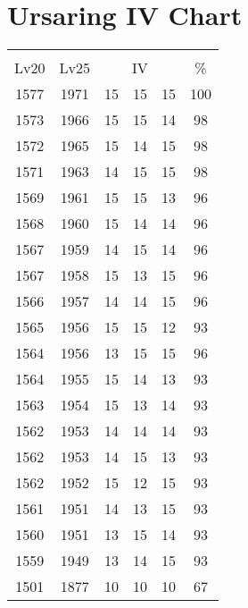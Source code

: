 \documentclass{article}%
\begin{document}
%
\normalsize%
\section{Ursaring IV Chart}%
\label{sec:Ursaring IV Chart}%
\renewcommand{\arraystretch}{1.5}%
\begin{tabular}{|c|c|c|c|c|c|}%
\hline%
\multicolumn{6}{|c|}{\textcolor{white}{ 
\linebreak{Ursaring}
}%
\cellcolor{black}}\\%
\multicolumn{1}{|c}{Lv20}&\multicolumn{1}{c|}{Lv25}&\multicolumn{3}{c|}{IV}&\multicolumn{1}{|c|}{\%}\\%
\hline%
\rowcolor{color100}%
1577&1971&15&15&15&100\\%
\hline%
\rowcolor{color98}%
1573&1966&15&15&14&98\\%
\hline%
\rowcolor{color98}%
1572&1965&15&14&15&98\\%
\hline%
\rowcolor{color98}%
1571&1963&14&15&15&98\\%
\hline%
\rowcolor{color96}%
1569&1961&15&15&13&96\\%
\hline%
\rowcolor{color96}%
1568&1960&15&14&14&96\\%
\hline%
\rowcolor{color96}%
1567&1959&14&15&14&96\\%
\hline%
\rowcolor{color96}%
1567&1958&15&13&15&96\\%
\hline%
\rowcolor{color96}%
1566&1957&14&14&15&96\\%
\hline%
\rowcolor{color93}%
1565&1956&15&15&12&93\\%
\hline%
\rowcolor{color96}%
1564&1956&13&15&15&96\\%
\hline%
\rowcolor{color93}%
1564&1955&15&14&13&93\\%
\hline%
\rowcolor{color93}%
1563&1954&15&13&14&93\\%
\hline%
\rowcolor{color93}%
1562&1953&14&14&14&93\\%
\hline%
\rowcolor{color93}%
1562&1953&14&15&13&93\\%
\hline%
\rowcolor{color93}%
1562&1952&15&12&15&93\\%
\hline%
\rowcolor{color93}%
1561&1951&14&13&15&93\\%
\hline%
\rowcolor{color93}%
1560&1951&13&15&14&93\\%
\hline%
\rowcolor{color93}%
1559&1949&13&14&15&93\\%
\hline%
\rowcolor{color91}%
1501&1877&10&10&10&67\\%
\end{tabular}

%
\end{document}
